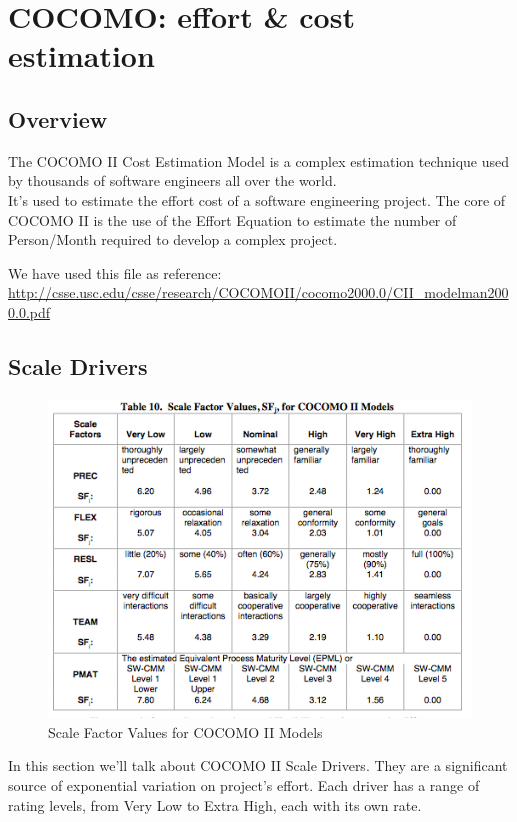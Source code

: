 \section{COCOMO: effort \& cost estimation}
\subsection{Overview} %
\label{sub:cocomo_overview}
The COCOMO II Cost Estimation Model is a complex estimation technique used 
by thousands of software engineers all over the world. \\
It's used to estimate the effort cost of a software engineering project.
The core of COCOMO II is the use of the Effort Equation to estimate the number
of Person/Month required to develop a complex project.

We have used this file as reference: \\ 
\url{http://csse.usc.edu/csse/research/COCOMOII/cocomo2000.0/CII_modelman2000.0.pdf}

\subsection{Scale Drivers} %
\label{sub:scale_drivers}
\begin{figure}[h]
    \includegraphics[trim={0.23cm 0.2cm 0.43cm 0.55cm},clip,width=\linewidth]{img/scaledriver.png}
    \caption{Scale Factor Values for COCOMO II Models}
    \label{tbl:scale}
\end{figure}

\pagebreak 
In this section we'll talk about COCOMO II Scale Drivers. They are a significant
source of exponential variation on project's effort. Each driver has a range of 
rating levels, from Very Low to Extra High, each with its own rate. 

